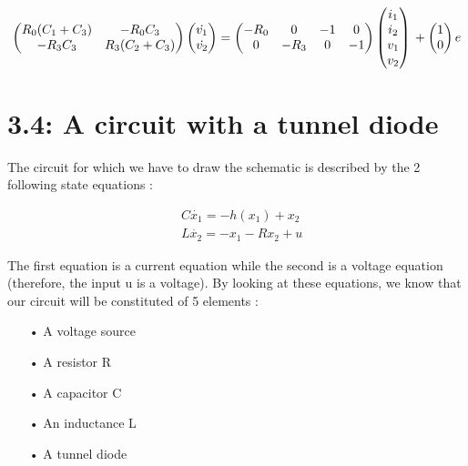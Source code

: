 \begin{equation}
\begin{pmatrix}
R_0(C_1+C_3) & -R_0C_3\\
-R_3C_3 & R_3(C_2+C_3)
\end{pmatrix}
\begin{pmatrix}
\dot{v_1}\\
\dot{v_2}
\end{pmatrix}
=
\begin{pmatrix}
-R_0 & 0 & -1 & 0\\
0 & -R_3 & 0 & -1
\end{pmatrix}
\begin{pmatrix}
i_1\\
i_2\\
v_1\\
v_2
\end{pmatrix}\\
+
\begin{pmatrix}
1\\
0
\end{pmatrix}
e
\end{equation}

\newpage

\section*{3.4: A circuit with a tunnel diode}

The circuit for which we have to draw the schematic is described by the 2 following state equations :

\begin{equation}
\begin{split}
&C\dot{x_1} = -h(x_1)+x_2\\
&L\dot{x_2} = -x_1 - Rx_2 + u
\end{split} 
\end{equation}

The first equation is a current equation while the second is a voltage equation (therefore, the input u is a voltage). By looking at these equations, we know that our circuit will be constituted of 5 elements :\\

\begin{itemize}
\item[•] A voltage source
\item[•] A resistor R
\item[•] A capacitor C
\item[•] An inductance L
\item[•] A tunnel diode\\
\end{itemize}

